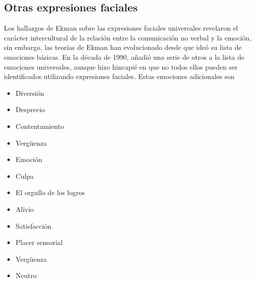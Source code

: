 \subsection{Otras expresiones faciales}
Los hallazgos de Ekman sobre las expresiones faciales universales revelaron el carácter intercultural de la relación entre la comunicación no verbal y la emoción, sin embargo, las teorías de Ekman han evolucionado desde que ideó su lista de emociones básicas. En la década de 1990, añadió una serie de otros a la lista de emociones universales, aunque hizo hincapié en que no todos ellos pueden ser identificados utilizando expresiones faciales. Estas emociones adicionales son~\cite{29ekman2016scientists}

\begin{itemize}
\item Diversión
\item Desprecio
\item Contentamiento
\item Vergüenza	
\item Emoción
\item Culpa
\item El orgullo de los logros
\item Alivio
\item Satisfacción
\item Placer sensorial
\item Vergüenza
\item Neutro
\end{itemize}
